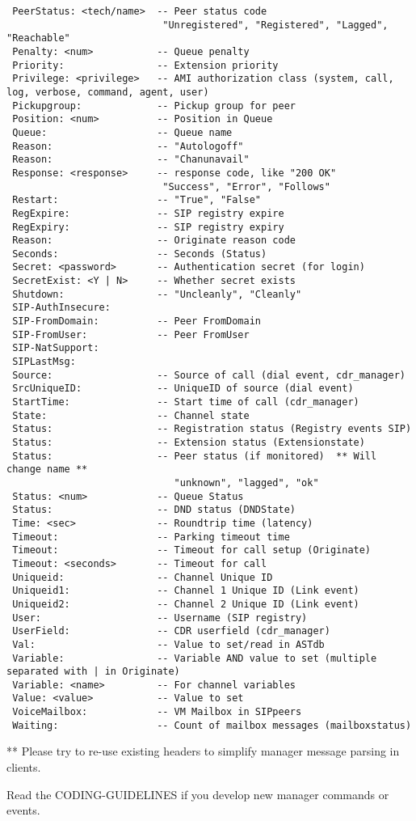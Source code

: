 \begin{verbatim}
 PeerStatus: <tech/name>  -- Peer status code 
                           "Unregistered", "Registered", "Lagged", "Reachable"
 Penalty: <num>           -- Queue penalty
 Priority:                -- Extension priority
 Privilege: <privilege>   -- AMI authorization class (system, call, log, verbose, command, agent, user)
 Pickupgroup:             -- Pickup group for peer
 Position: <num>          -- Position in Queue
 Queue:                   -- Queue name
 Reason:                  -- "Autologoff"
 Reason:                  -- "Chanunavail"
 Response: <response>     -- response code, like "200 OK"
                           "Success", "Error", "Follows"
 Restart:                 -- "True", "False"
 RegExpire:               -- SIP registry expire
 RegExpiry:               -- SIP registry expiry
 Reason:                  -- Originate reason code
 Seconds:                 -- Seconds (Status)
 Secret: <password>       -- Authentication secret (for login)
 SecretExist: <Y | N>     -- Whether secret exists 
 Shutdown:                -- "Uncleanly", "Cleanly" 
 SIP-AuthInsecure:
 SIP-FromDomain:          -- Peer FromDomain
 SIP-FromUser:            -- Peer FromUser
 SIP-NatSupport:
 SIPLastMsg:
 Source:                  -- Source of call (dial event, cdr_manager)
 SrcUniqueID:             -- UniqueID of source (dial event)
 StartTime:               -- Start time of call (cdr_manager)
 State:                   -- Channel state
 Status:                  -- Registration status (Registry events SIP)
 Status:                  -- Extension status (Extensionstate)
 Status:                  -- Peer status (if monitored)  ** Will change name **
                             "unknown", "lagged", "ok"
 Status: <num>            -- Queue Status
 Status:                  -- DND status (DNDState)
 Time: <sec>              -- Roundtrip time (latency)
 Timeout:                 -- Parking timeout time
 Timeout:                 -- Timeout for call setup (Originate)
 Timeout: <seconds>       -- Timeout for call
 Uniqueid:                -- Channel Unique ID
 Uniqueid1:               -- Channel 1 Unique ID (Link event)
 Uniqueid2:               -- Channel 2 Unique ID (Link event)
 User:                    -- Username (SIP registry)
 UserField:               -- CDR userfield (cdr_manager)
 Val:                     -- Value to set/read in ASTdb
 Variable:                -- Variable AND value to set (multiple separated with | in Originate)
 Variable: <name>         -- For channel variables
 Value: <value>           -- Value to set
 VoiceMailbox:            -- VM Mailbox in SIPpeers
 Waiting:                 -- Count of mailbox messages (mailboxstatus)
\end{verbatim}

 ** Please try to re-use existing headers to simplify manager message parsing in clients.

Read the CODING-GUIDELINES if you develop new manager commands or events.
